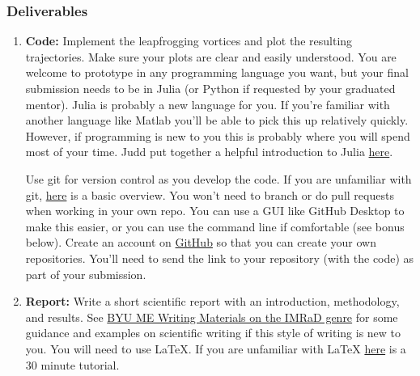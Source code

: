 \documentclass{article}
\begin{document}
\subsubsection*{Deliverables}

\begin{enumerate}
    \item \textbf{Code:} Implement the leapfrogging vortices and plot the resulting trajectories. Make sure your plots are clear and easily understood.  You are welcome to prototype in any programming language you want, but your final submission needs to be in Julia (or Python if requested by your graduated mentor).  Julia is probably a new language for you.  If you're familiar with another language like Matlab you'll be able to pick this up relatively quickly.  However, if programming is new to you this is probably where you will spend most of your time. Judd put together a helpful introduction to Julia \href{https://github.com/byuflowlab/undergrad-onboarding/blob/master/julia.md}{here}.
    
    Use git for version control as you develop the code.  If you are unfamiliar with git, \href{https://guides.github.com/introduction/git-handbook/}{here} is a basic overview.  You won't need to branch or do pull requests when working in your own repo.  You can use a GUI like GitHub Desktop to make this easier, or you can use the command line if comfortable (see bonus below).  Create an account on \href{https://github.com}{GitHub} so that you can create your own repositories.  You'll need to send the link to your repository (with the code) as part of your submission.
    
    \item \textbf{Report:} Write a short scientific report with an introduction, methodology, and results.  See \href{https://me.byu.edu/resources}{BYU ME Writing Materials on the IMRaD genre} for some guidance and examples on scientific writing if this style of writing is new to you.  You will need to use LaTeX.  If you are unfamiliar with LaTeX \href{https://www.overleaf.com/learn/latex/Learn_LaTeX_in_30_minutes}{here} is a 30 minute tutorial.  
\end{enumerate}
\end{document}
